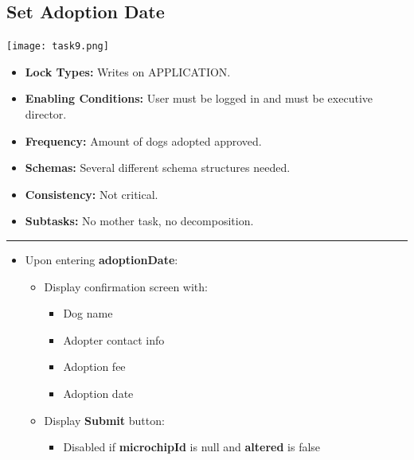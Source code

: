 \documentclass{article}
\begin{document}
\subsection{Set Adoption Date}
\begin{center}
    \texttt{[image: task9.png]}
\end{center}
\begin{itemize}
    \item \textbf{Lock Types:} Writes on APPLICATION.
    \item \textbf{Enabling Conditions:} User must be logged in and must be executive director.
    \item \textbf{Frequency:} Amount of dogs adopted approved.
    \item \textbf{Schemas:} Several different schema structures needed.
    \item \textbf{Consistency:} Not critical.
    \item \textbf{Subtasks:} No mother task, no decomposition.
\end{itemize}
\noindent\rule{8cm}{0.4pt}
\begin{itemize}
\item Upon entering 	\textbf{adoptionDate}:
\begin{itemize}
    \item Display confirmation screen with:
    \begin{itemize}
        \item Dog name
        \item Adopter contact info
        \item Adoption fee
        \item Adoption date
    \end{itemize}
    \item Display 	\textbf{Submit} button:
    \begin{itemize}
        \item Disabled if 	\textbf{microchipId} is null and 	\textbf{altered} is false
    \end{itemize}
\end{itemize}        
\end{itemize}        
\end{document}
